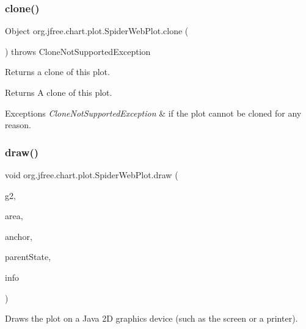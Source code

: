 \subsubsection{\texorpdfstring{clone()}{clone()}}
{\footnotesize\ttfamily Object org.\+jfree.\+chart.\+plot.\+Spider\+Web\+Plot.\+clone (\begin{DoxyParamCaption}{ }\end{DoxyParamCaption}) throws Clone\+Not\+Supported\+Exception}

Returns a clone of this plot.

\begin{DoxyReturn}{Returns}
A clone of this plot.
\end{DoxyReturn}

\begin{DoxyExceptions}{Exceptions}
{\em Clone\+Not\+Supported\+Exception} & if the plot cannot be cloned for any reason. \\
\hline
\end{DoxyExceptions}
\mbox{\label{classorg_1_1jfree_1_1chart_1_1plot_1_1_spider_web_plot_abf5cfbcc013ea362693b1328aab66da4}} 
\subsubsection{\texorpdfstring{draw()}{draw()}}
{\footnotesize\ttfamily void org.\+jfree.\+chart.\+plot.\+Spider\+Web\+Plot.\+draw (\begin{DoxyParamCaption}\item[{Graphics2D}]{g2,  }\item[{Rectangle2D}]{area,  }\item[{Point2D}]{anchor,  }\item[{\mbox{\hyperlink{classorg_1_1jfree_1_1chart_1_1plot_1_1_plot_state}{Plot\+State}}}]{parent\+State,  }\item[{\mbox{\hyperlink{classorg_1_1jfree_1_1chart_1_1plot_1_1_plot_rendering_info}{Plot\+Rendering\+Info}}}]{info }\end{DoxyParamCaption})}

Draws the plot on a Java 2D graphics device (such as the screen or a printer).


